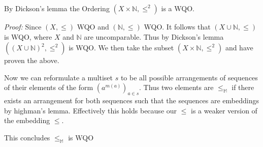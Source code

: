 By Dickson's lemma the Ordering $(X \times \mathbb{N},\leq^2)$ is a WQO. 

\textit{Proof:} Since $(X,\leq)$ WQO and $(\mathbb{N},\leq)$ WQO. It follows that $(X \cup \mathbb{N},\leq)$ is WQO, where $X$ and $\mathbb{N}$ are uncomparable. Thus by Dickson's lemma $((X \cup \mathbb{N})^2,\leq^2)$ is WQO. We then take the subset $(X \times \mathbb{N},\leq^2)$ and have proven the above.

Now we can reformulate a multiset $s$ to be all possible arrangements of sequences of their elements of the form $(a^{m(a)})_{a \in s}$. Thus two elements are $\leq_{\mathbb{M}}$ if there exists an arrangement for both sequences such that the sequences are embeddings by highman's lemma. Effectively this holds because our $\leq$ is a weaker version of the embedding $\leq$.

This concludes $\leq_\mathbb{M}$ is WQO